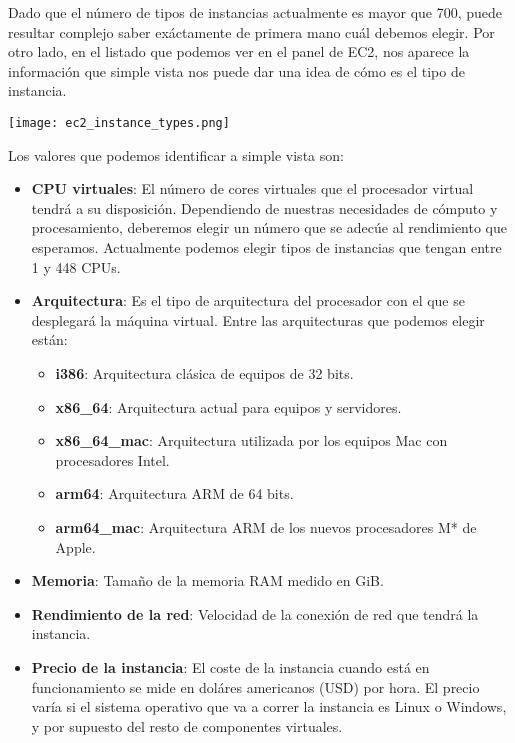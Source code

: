 Dado que el número de tipos de instancias actualmente es mayor que 700, puede resultar complejo saber exáctamente de primera mano cuál debemos elegir. Por otro lado, en el listado que podemos ver en el panel de EC2, nos aparece la información que simple vista nos puede dar una idea de cómo es el tipo de instancia.


\begin{center}
	\texttt{[image: ec2\_instance\_types.png]}
\end{center}

Los valores que podemos identificar a simple vista son:

\begin{itemize}
	\item \textbf{CPU virtuales}: El número de cores virtuales que el procesador virtual tendrá a su disposición. Dependiendo de nuestras necesidades de cómputo y procesamiento, deberemos elegir un número que se adecúe al rendimiento que esperamos. Actualmente podemos elegir tipos de instancias que tengan entre 1 y 448 CPUs.
	
	\item \textbf{Arquitectura}: Es el tipo de arquitectura del procesador con el que se desplegará la máquina virtual. Entre las arquitecturas que podemos elegir están:
	\begin{itemize}
		\item \textbf{i386}: Arquitectura clásica de equipos de 32 bits.
		\item \textbf{x86\_64}: Arquitectura actual para equipos y servidores.
		\item \textbf{x86\_64\_mac}: Arquitectura utilizada por los equipos Mac con procesadores Intel.
		\item \textbf{arm64}: Arquitectura ARM de 64 bits.
		\item \textbf{arm64\_mac}: Arquitectura ARM de los nuevos procesadores M* de Apple.
	\end{itemize}
	
	\item \textbf{Memoria}: Tamaño de la memoria RAM medido en GiB.
	
	\item \textbf{Rendimiento de la red}: Velocidad de la conexión de red que tendrá la instancia.
	
	\item \textbf{Precio de la instancia}: El coste de la instancia cuando está en funcionamiento se mide en doláres americanos (USD) por hora. El precio varía si el sistema operativo que va a correr la instancia es Linux o Windows, y por supuesto del resto de componentes virtuales.
	
\end{itemize}

